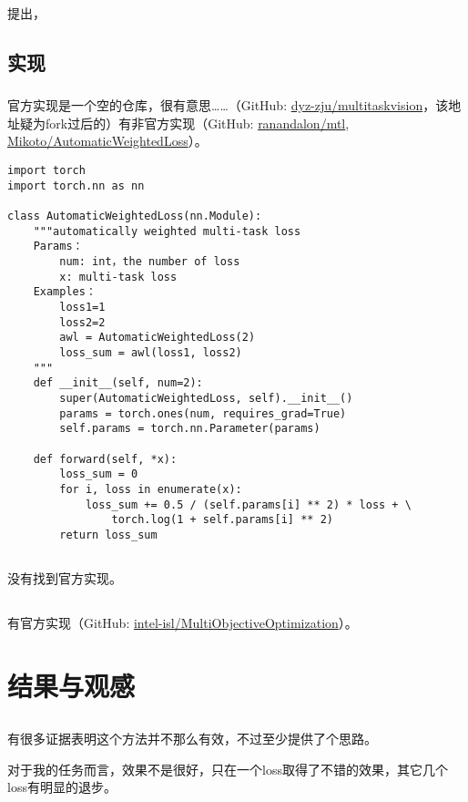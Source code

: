 \documentclass{ctexart}
\begin{document}
\citet{Sener18Pareto}提出，

\subsection{实现}

\subsubsection{}

官方实现是一个空的仓库，很有意思……（GitHub: \href{https://github.com/dyz-zju/multitaskvision}{dyz-zju/multitaskvision}，该地址疑为fork过后的）有非官方实现（GitHub: \href{https://github.com/ranandalon/mtl}{ranandalon/mtl}, \href{https://github.com/Mikoto10032/AutomaticWeightedLoss}{Mikoto/Automatic\-Weighted\-Loss}）。

\begin{verbatim}
import torch
import torch.nn as nn

class AutomaticWeightedLoss(nn.Module):
    """automatically weighted multi-task loss
    Params：
        num: int，the number of loss
        x: multi-task loss
    Examples：
        loss1=1
        loss2=2
        awl = AutomaticWeightedLoss(2)
        loss_sum = awl(loss1, loss2)
    """
    def __init__(self, num=2):
        super(AutomaticWeightedLoss, self).__init__()
        params = torch.ones(num, requires_grad=True)
        self.params = torch.nn.Parameter(params)

    def forward(self, *x):
        loss_sum = 0
        for i, loss in enumerate(x):
            loss_sum += 0.5 / (self.params[i] ** 2) * loss + \
                torch.log(1 + self.params[i] ** 2)
        return loss_sum
\end{verbatim}

\subsection{}

没有找到官方实现。

\subsection{}

有官方实现（GitHub: \href{https://github.com/intel-isl/MultiObjectiveOptimization}{intel-isl/MultiObjectiveOptimization}）。

\section{结果与观感}

\subsection{}

有很多证据表明这个方法并不那么有效，不过至少提供了个思路。

对于我的任务而言，效果不是很好，只在一个loss取得了不错的效果，其它几个loss有明显的退步。


\end{document}
